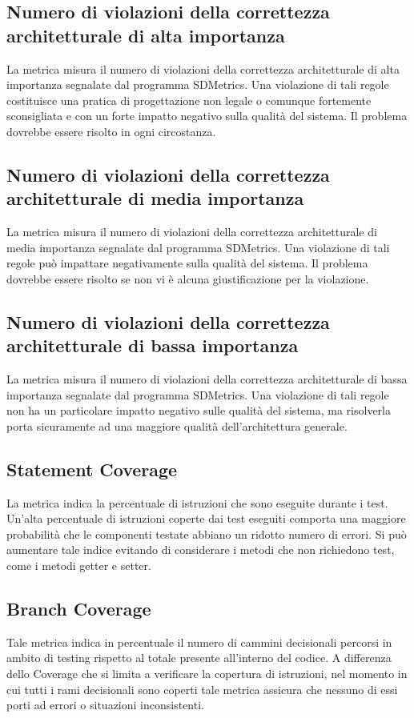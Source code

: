 \subsection{Numero di violazioni della correttezza architetturale di alta importanza}
La metrica misura il numero di violazioni della correttezza architetturale di alta importanza segnalate dal programma SDMetrics. Una violazione di tali regole costituisce una pratica di progettazione non legale o comunque fortemente sconsigliata e con un forte impatto negativo sulla qualità del sistema. Il problema dovrebbe essere risolto in ogni circostanza.

\subsection{Numero di violazioni della correttezza architetturale di media importanza}
La metrica misura il numero di violazioni della correttezza architetturale di media importanza segnalate dal programma SDMetrics. Una violazione di tali regole può impattare negativamente sulla qualità del sistema. Il problema dovrebbe essere risolto se non vi è alcuna giustificazione per la violazione.

\subsection{Numero di violazioni della correttezza architetturale di bassa importanza}
La metrica misura il numero di violazioni della correttezza architetturale di bassa importanza segnalate dal programma SDMetrics. Una violazione di tali regole non ha un particolare impatto negativo sulle qualità del sistema, ma risolverla porta sicuramente ad una maggiore qualità dell'architettura generale.

\subsection{Statement Coverage}
La metrica indica la percentuale di istruzioni che sono eseguite durante i test. Un'alta percentuale di istruzioni coperte dai test eseguiti comporta una maggiore probabilità che le componenti testate abbiano un ridotto numero di errori. Si può aumentare tale indice evitando di considerare i metodi che non richiedono test, come i metodi getter e setter.

\subsection{Branch Coverage}
Tale metrica indica in percentuale il numero di cammini decisionali percorsi in ambito di testing rispetto al totale presente all'interno del codice. A differenza dello  Coverage che si limita a verificare la copertura di istruzioni, nel momento in cui tutti i rami decisionali sono coperti tale metrica assicura che nessuno di essi porti ad errori o situazioni inconsistenti.

